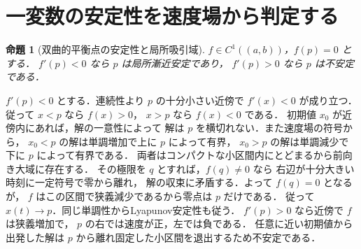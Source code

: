 \documentclass[a5paper,10pt,onecolumn]{jsarticle}
\makeatletter
\theoremstyle{mathnotetheorem}
\newtheorem{proposition}[theorem]{命題}
\renewcommand{\proofname}{証明}
\renewenvironment{proof}[1][\proofname]{%
  \par\pushQED{\qed}\normalfont\topsep4\p@\@plus2\p@\relax
  \trivlist\item[\hskip\labelsep\bfseries #1]\ignorespaces
}{\popQED\endtrivlist\@endpefalse}
\makeatother
\begin{document}
\section{一変数の安定性を速度場から判定する}
\begin{proposition}[双曲的平衡点の安定性と局所吸引域]\label{prop:bif-hyperbolic}
$f\in C^1((a,b))$，$f(p)=0$ とする．
$f'(p)<0$ なら $p$ は局所漸近安定であり，
$f'(p)>0$ なら $p$ は不安定である．
\end{proposition}
\begin{proof}
$f'(p)<0$ とする．連続性より $p$ の十分小さい近傍で
$f'(x)<0$ が成り立つ．従って $x<p$ なら $f(x)>0$，
$x>p$ なら $f(x)<0$ である．
初期値 $x_0$ が近傍内にあれば，解の一意性によって
解は $p$ を横切れない．また速度場の符号から，
$x_0<p$ の解は単調増加で上に $p$ によって有界，
$x_0>p$ の解は単調減少で下に $p$ によって有界である．
両者はコンパクトな小区間内にとどまるから前向き大域に存在する．
その極限を $q$ とすれば，$f(q)\ne0$ なら
右辺が十分大きい時刻に一定符号で零から離れ，
解の収束に矛盾する．よって $f(q)=0$ となるが，
$f$ はこの区間で狭義減少であるから零点は $p$ だけである．
従って $x(t)\to p$．同じ単調性からLyapunov安定性も従う．
$f'(p)>0$ なら近傍で $f$ は狭義増加で，
$p$ の右では速度が正，左では負である．
任意に近い初期値から出発した解は
$p$ から離れ固定した小区間を退出するため不安定である．
\end{proof}
\end{document}
